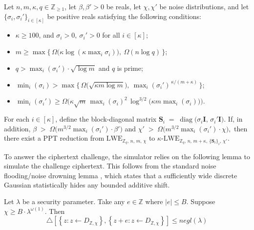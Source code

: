 \begin{theorem}
\label{theo:k_LWE}
Let $n, m, \kappa, q \in \mathbb{Z}_{\geq 1}$, let $\beta, \beta' > 0$ be reals,
let $\chi, \chi'$ be noise distributions, and let
$\{\sigma_i, \sigma_i'\}_{i \in [\kappa]}$ be positive reals satisfying the
following conditions:
\begin{itemize}
  \item $\kappa \geq 100$, \quad and \quad $\sigma_i > 0,\ \sigma_i' > 0$
        for all $i \in [\kappa]$;
  \item $m \geq \max\!\Big\{\, \Omega\!\big(\kappa \log(\kappa \max_i \sigma_i)\big),\
        \Omega(n \log q) \,\Big\}$;
  \item $q > \max_i(\sigma_i') \cdot \sqrt{\log m}$ \quad and \quad $q$ is prime;
  \item $\displaystyle \min_i(\sigma_i)
        > \max\!\Big\{\, \Omega\!\big(\sqrt{\kappa m \log m}\big),\
        \max_i(\sigma_i')^{\,\kappa/(m+\kappa)} \,\Big\}$;
  \item $\displaystyle \min_i(\sigma_i')
        \geq \Omega\!\Big( \kappa \sqrt{m}\, \max_i(\sigma_i)^2\,
        \log^{3/2}\!\big(\kappa m \max_i(\sigma_i)\big) \Big)$.
\end{itemize}

For each $i \in [\kappa]$, define the block-diagonal matrix
$
  \mathbf{S}_i \;=\; \operatorname{diag}\!\big(\sigma_i \mathbf{I},\, \sigma_i' \mathbf{I}\big).
$
If, in addition,
$
  \beta \;>\; \Omega\!\big( m^{3/2} \max_i(\sigma_i') \cdot \beta' \big)$
  and
$\chi' \;>\; \Omega\!\big( m^{3/2} \max_i(\sigma_i') \cdot \chi \big),
$
then there exist a \textup{PPT} reduction from
        $\mathrm{LWE}_{\mathbb{Z}_q,\, n,\, m,\, \chi}$
        to
        $\kappa\text{-}\mathrm{LWE}_{\mathbb{Z}_q,\, n,\, m+\kappa,\, \{\mathbf{S}_i\}_i,\, \chi'}$.

\end{theorem}
To answer the ciphertext challenge, the simulator relies on the following lemma to simulate the challenge ciphertext. This follows from the standard noise flooding/noise drowning lemma
\cite{GKPV10}, which states that a sufficiently wide discrete Gaussian
statistically hides any bounded additive shift.

\begin{lemma}
\label{lem:̉noise_flooding}
Let $\lambda$ be a security parameter. Take any $e \in \mathbb{Z}$ where
$|e| \leq B$. Suppose
$
\chi \geq B \cdot \lambda^{\omega(1)}.
$
Then
\[
\triangle\left[\left\{ z : z \leftarrow D_{\mathbb{Z},\chi} \right\},
\left\{ z + e : z \leftarrow D_{\mathbb{Z},\chi} \right\}\right]
\leq negl(\lambda)\]
\end{lemma}

